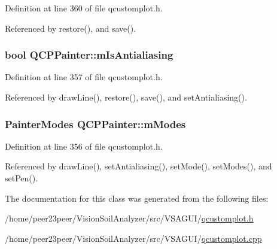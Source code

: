 Definition at line 360 of file qcustomplot.\+h.



Referenced by restore(), and save().

\hypertarget{class_q_c_p_painter_a7055085da176aee0f6b23298f1003d08}{}
\subsubsection[{m\+Is\+Antialiasing}]{\setlength{\rightskip}{0pt plus 5cm}bool Q\+C\+P\+Painter\+::m\+Is\+Antialiasing\hspace{0.3cm}{\ttfamily [protected]}}\label{class_q_c_p_painter_a7055085da176aee0f6b23298f1003d08}


Definition at line 357 of file qcustomplot.\+h.



Referenced by draw\+Line(), restore(), save(), and set\+Antialiasing().

\hypertarget{class_q_c_p_painter_af5d1d6e5df0adbc7de5633250fb3396c}{}
\subsubsection[{m\+Modes}]{\setlength{\rightskip}{0pt plus 5cm}Painter\+Modes Q\+C\+P\+Painter\+::m\+Modes\hspace{0.3cm}{\ttfamily [protected]}}\label{class_q_c_p_painter_af5d1d6e5df0adbc7de5633250fb3396c}


Definition at line 356 of file qcustomplot.\+h.



Referenced by draw\+Line(), set\+Antialiasing(), set\+Mode(), set\+Modes(), and set\+Pen().



The documentation for this class was generated from the following files\+:\begin{DoxyCompactItemize}
\item 
/home/peer23peer/\+Vision\+Soil\+Analyzer/src/\+V\+S\+A\+G\+U\+I/\hyperlink{qcustomplot_8h}{qcustomplot.\+h}\item 
/home/peer23peer/\+Vision\+Soil\+Analyzer/src/\+V\+S\+A\+G\+U\+I/\hyperlink{qcustomplot_8cpp}{qcustomplot.\+cpp}\end{DoxyCompactItemize}
